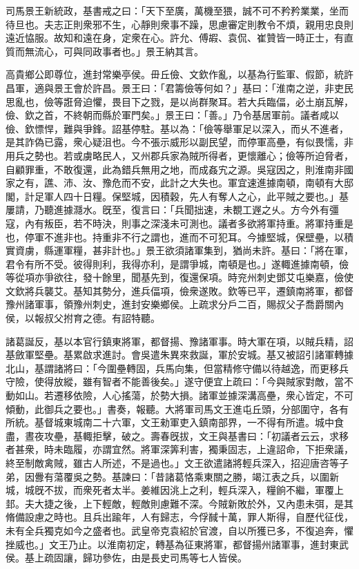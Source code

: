\begin{pinyinscope}
 
 
 
 司馬景王新統政，基書戒之曰：「天下至廣，萬機至猥，誠不可不矜矜業業，坐而待旦也。夫志正則衆邪不生，心靜則衆事不躁，思慮審定則教令不煩，親用忠良則遠近恊服。故知和遠在身，定衆在心。許允、傅嘏、袁侃、崔贊皆一時正士，有直質而無流心，可與同政事者也。」景王納其言。
 
 
 
 
 高貴鄉公即尊位，進封常樂亭侯。毌丘儉、文欽作亂，以基為行監軍、假節，統許昌軍，適與景王會於許昌。景王曰：「君籌儉等何如？」基曰：「淮南之逆，非吏民思亂也，儉等誑脅迫懼，畏目下之戮，是以尚群聚耳。若大兵臨偪，必土崩瓦解，儉、欽之首，不終朝而縣於軍門矣。」景王曰：「善。」乃令基居軍前。議者咸以儉、欽慓悍，難與爭鋒。詔基停駐。基以為：「儉等舉軍足以深入，而乆不進者，是其詐偽已露，衆心疑沮也。今不張示威形以副民望，而停軍高壘，有似畏懦，非用兵之勢也。若或虜略民人，又州郡兵家為賊所得者，更懷離心；儉等所迫脅者，自顧罪重，不敢復還，此為錯兵無用之地，而成姦宄之源。吳寇因之，則淮南非國家之有，譙、沛、汝、豫危而不安，此計之大失也。軍宜速進據南頓，南頓有大邸閣，計足軍人四十日糧。保堅城，因積穀，先人有奪人之心，此平賊之要也。」基屢請，乃聽進據㶏水。旣至，復言曰：「兵聞拙速，未覩工遟之乆。方今外有彊寇，內有叛臣，若不時決，則事之深淺未可測也。議者多欲將軍持重。將軍持重是也，停軍不進非也。持重非不行之謂也，進而不可犯耳。今據堅城，保壁壘，以積實資虜，縣運軍糧，甚非計也。」景王欲須諸軍集到，猶尚未許。基曰：「將在軍，君令有所不受。彼得則利，我得亦利，是謂爭城，南頓是也。」遂輙進據南頓，儉等從項亦爭欲往，發十餘里，聞基先到，復還保項。時兖州刺史鄧艾屯樂嘉，儉使文欽將兵襲艾。基知其勢分，進兵偪項，儉衆遂敗。欽等已平，遷鎮南將軍，都督豫州諸軍事，領豫州刺史，進封安樂鄉侯。上疏求分戶二百，賜叔父子喬爵關內侯，以報叔父拊育之德。有詔特聽。
 
 
 
 
 諸葛誕反，基以本官行鎮東將軍，都督揚、豫諸軍事。時大軍在項，以賊兵精，詔基斂軍堅壘。基累啟求進討。會吳遣朱異來救誕，軍於安城。基又被詔引諸軍轉據北山，基謂諸將曰：「今圍壘轉固，兵馬向集，但當精修守備以待越逸，而更移兵守險，使得放縱，雖有智者不能善後矣。」遂守便宜上疏曰：「今與賊家對敵，當不動如山。若遷移依險，人心搖蕩，於勢大損。諸軍並據深溝高壘，衆心皆定，不可傾動，此御兵之要也。」書奏，報聽。大將軍司馬文王進屯丘頭，分部圍守，各有所統。基督城東城南二十六軍，文王勑軍吏入鎮南部界，一不得有所遣。城中食盡，晝夜攻壘，基輙拒擊，破之。壽春旣拔，文王與基書曰：「初議者云云，求移者甚衆，時未臨履，亦謂宜然。將軍深筭利害，獨秉固志，上違詔命，下拒衆議，終至制敵禽賊，雖古人所述，不是過也。」文王欲遣諸將輕兵深入，招迎唐咨等子弟，因釁有蕩覆吳之勢。基諫曰：「昔諸葛恪乘東關之勝，竭江表之兵，以圍新城，城旣不拔，而衆死者太半。姜維因洮上之利，輕兵深入，糧餉不繼，軍覆上邽。夫大捷之後，上下輕敵，輕敵則慮難不深。今賊新敗於外，又內患未弭，是其脩備設慮之時也。且兵出踰年，人有歸志，今俘馘十萬，罪人斯得，自歷代征伐，未有全兵獨克如今之盛者也。武皇帝克袁紹於官渡，自以所獲已多，不復追奔，懼挫威也。」文王乃止。以淮南初定，轉基為征東將軍，都督揚州諸軍事，進封東武侯。基上疏固讓，歸功參佐，由是長史司馬等七人皆侯。
 

\end{pinyinscope}
